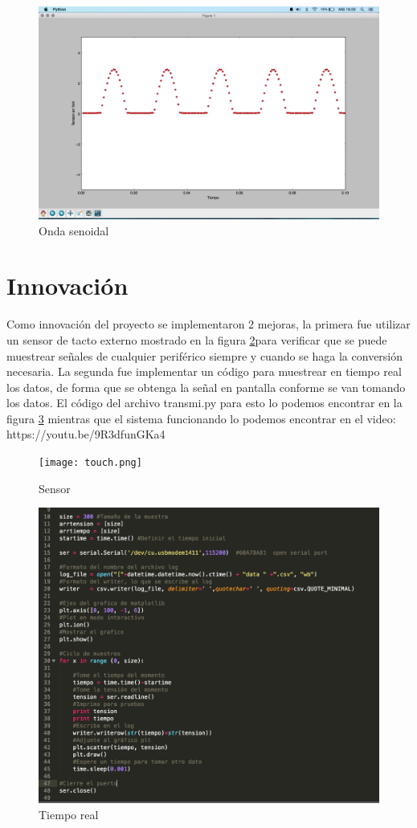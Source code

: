 \documentclass[letterpaper]{article}
\begin{document}
\begin{figure}[hbtp]
\centering
\includegraphics[width=12 cm]{signals.png}
\caption{Onda senoidal}
\label{dat1}
\end{figure}

\newpage

\section{Innovación}

Como innovación del proyecto se implementaron 2 mejoras, la primera fue utilizar un sensor de tacto externo mostrado en la figura \ref{touch}para verificar que se puede muestrear señales de cualquier periférico siempre y cuando se haga la conversión necesaria. La segunda fue implementar un código para muestrear en tiempo real los datos, de forma que se obtenga la señal en pantalla conforme se van tomando los datos.
El código del archivo transmi.py para esto lo podemos encontrar en la figura \ref{dat2} mientras que el sistema funcionando lo podemos encontrar en el video: https://youtu.be/9R3dfunGKa4 

\begin{figure}[hbtp]
\centering
\texttt{[image: touch.png]}
\caption{Sensor}
\label{touch}
\end{figure}

\begin{figure}[hbtp]
\centering
\includegraphics[width=12 cm]{tmpreal.png}
\caption{Tiempo real}
\label{dat2}
\end{figure}
\end{document}
